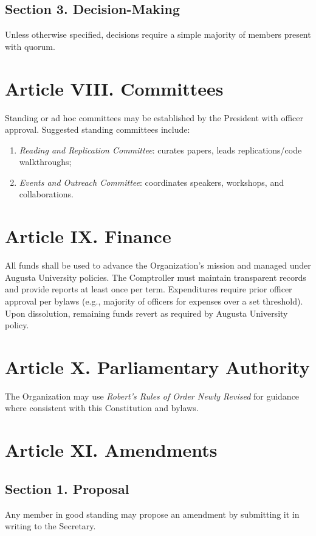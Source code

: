 \documentclass[12pt]{article}
\newcommand{\university}{Augusta University}
\begin{document}
\subsection*{Section 3. Decision-Making}
Unless otherwise specified, decisions require a simple majority of members present with quorum.

\section*{Article VIII. Committees}
Standing or ad hoc committees may be established by the President with officer approval. Suggested standing committees include:
\begin{enumerate}[label=\alph*)]
    \item \textit{Reading and Replication Committee}: curates papers, leads replications/code walkthroughs;
    \item \textit{Events and Outreach Committee}: coordinates speakers, workshops, and collaborations.
\end{enumerate}

\section*{Article IX. Finance}
All funds shall be used to advance the Organization’s mission and managed under \university{} policies. The Comptroller must maintain transparent records and provide reports at least once per term. Expenditures require prior officer approval per bylaws (e.g., majority of officers for expenses over a set threshold). Upon dissolution, remaining funds revert as required by \university{} policy.

\section*{Article X. Parliamentary Authority}
The Organization may use \textit{Robert’s Rules of Order Newly Revised} for guidance where consistent with this Constitution and bylaws.

\section*{Article XI. Amendments}
\subsection*{Section 1. Proposal}
Any member in good standing may propose an amendment by submitting it in writing to the Secretary.
\end{document}
